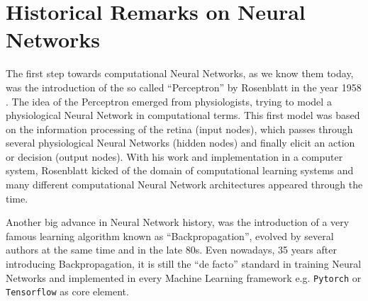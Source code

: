 
\section{Historical Remarks on Neural Networks}\label{sec:prev_history}
The first step towards computational Neural Networks, as we know them today, was the introduction of the so called \enquote{Perceptron} by Rosenblatt in the year 1958 \cite{Rosenblatt1958}. 
The idea of the Perceptron emerged from physiologists, trying to model a physiological Neural Network in computational terms. 
This first model was based on the information processing of the retina (input nodes), which passes through several physiological Neural Networks (hidden nodes) and finally elicit an action or decision (output nodes).
With his work and implementation in a computer system, Rosenblatt kicked of the domain of computational learning systems and many different computational Neural Network architectures appeared through the time.

Another big advance in Neural Network history, was the introduction of a very famous learning algorithm known as \enquote{Backpropagation}, evolved by several authors at the same time \cite{LeCun1986} and \cite{Rumelhart1986} in the late 80s. Even nowadays, 35 years after introducing Backpropagation, it is still the \enquote{de facto} standard in training Neural Networks and implemented in every Machine Learning framework e.g. \texttt{Pytorch} or \texttt{Tensorflow} as core element.
